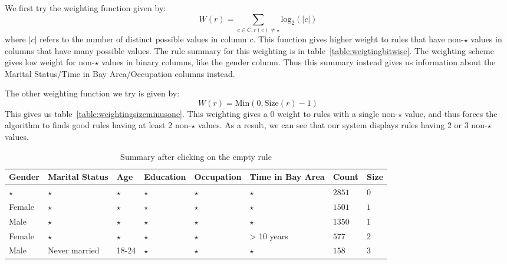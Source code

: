 \documentclass{sig-alternate}
\begin{document}
We first try the weighting function given by:
$$W(r) = \sum_{c \in C : r(c) \neq \star} \text{log}_2(|c|)$$ where $|c|$ refers to the number of distinct possible values in column $c$. This function gives higher weight to rules that have non-$\star$ values in columns that have many possible values. The rule summary for this weighting is in table~\ref{table:weigtingbitwise}. The weighting scheme gives low weight for non-$\star$ values in binary columns, like the gender column. Thus this summary instead gives us information about the Marital Status/Time in Bay Area/Occupation columns instead.  

The other weighting function we try is given by:
$$W(r) = \text{Min}(0, \text{Size}(r) - 1)$$
This gives us table~\ref{table:weightingsizeminusone}. This weighting gives a $0$ weight to rules with a single non-$\star$ value, and thus forces the algorithm to finds good rules having at least $2$ non-$\star$ values. As a result, we can see that our system displays rules having $2$ or $3$ non-$\star$ values. 

\begin{table*} 
\centering 
\begin{tabular}{| p{1.5cm} | p{1.5cm} | p{1.5cm} | p{1.5cm} | p{1.5cm} | p{1.5cm} | l | l |} 
\hline Gender & Marital Status & Age & Education & Occupation & Time in Bay Area & Count & Size \\ \hline 
\cline{1-8} $\star$ & $\star$ & $\star$ & $\star$ & $\star$ & $\star$ & $2851$ & $0$ \\
\cline{1-1} \cline{2-2} \cline{3-3} \cline{4-4} \cline{5-5} \cline{6-6} \cline{7-8} Female & $\star$ & $\star$ & $\star$ & $\star$ & $\star$ & $1501$ & $1$ \\
\cline{1-1} \cline{2-2} \cline{3-3} \cline{4-4} \cline{5-5} \cline{6-6} \cline{7-8} Male & $\star$ & $\star$ & $\star$ & $\star$ & $\star$ & $1350$ & $1$ \\
\cline{1-1} \cline{2-2} \cline{3-3} \cline{4-4} \cline{5-5} \cline{6-6} \cline{7-8} Female & $\star$ & $\star$ & $\star$ & $\star$ & > 10 years & $577$ & $2$ \\
\cline{1-1} \cline{2-2} \cline{3-3} \cline{4-4} \cline{5-5} \cline{6-6} \cline{7-8} Male & Never married & 18-24 & $\star$ & $\star$ & $\star$ & $158$ & $3$ \\
\hline 
\end{tabular} 
\caption{Summary after clicking on the empty rule \label{table:uiexample1}} 
\end{table*} 
\end{document}
